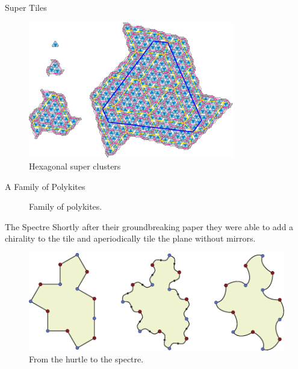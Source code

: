 \documentclass{beamer}
\begin{document}
\begin{frame}{Super Tiles}
    \begin{figure}
        \centering
        \includegraphics[page=1,width=0.8\textwidth]{images/aperiodic-pdfs/hexclusters.pdf}
        \caption{Hexagonal super clusters\cite{Smith_2024}}
        \label{fig:hex-superculsters}
    \end{figure}
\end{frame}

\begin{frame}{A Family of Polykites}
    \begin{figure}
        \centering
        
        \caption{Family of polykites. \cite{Smith_2024}}
        \label{fig:other-polykites}
    \end{figure}
\end{frame}

\begin{frame}{The Spectre}
    Shortly after their groundbreaking paper they were able to add a chirality to the tile and aperiodically tile the plane without mirrors. \cite{Smith_2024_chiral}
    \begin{figure}
        \centering
        \includegraphics[width=\linewidth]{images/aperiodic-pdfs/polygon_to_spectre.pdf}
        \caption{From the hurtle to the spectre. \cite{Smith_2024_chiral}}
        \label{fig:turle-spectra}
    \end{figure}
\end{frame}
\end{document}
